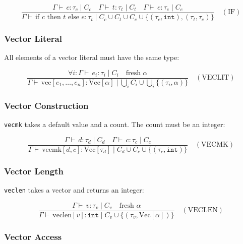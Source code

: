 \documentclass[12pt]{article}
\newcommand{\judge}[1]{\vdash \, #1}
\newcommand{\env}{\Gamma}
\newcommand{\type}{\tau}
\begin{document}
\begin{equation*}
\frac{
  \env \judge{c : \type_c \mid C_c}
  \quad
  \env \judge{t : \type_t \mid C_t}
  \quad
  \env \judge{e : \type_e \mid C_e}
}{
  \env \judge{\text{if } c \text{ then } t \text{ else } e : \type_t \mid C_c \cup C_t \cup C_e \cup \{(\type_c, \mathtt{int}), (\type_t, \type_e)\}}
}
\quad (\text{IF})
\end{equation*}

\subsubsection{Vector Literal}

All elements of a vector literal must have the same type:

\begin{equation*}
\frac{
  \forall i : \env \judge{e_i : \type_i \mid C_i}
  \quad
  \text{fresh } \alpha
}{
  \env \judge{\text{vec}[e_1, \ldots, e_n] : \text{Vec}[\alpha] \mid \bigcup_i C_i \cup \bigcup_i \{(\type_i, \alpha)\}}
}
\quad (\text{VECLIT})
\end{equation*}

\subsubsection{Vector Construction}

\texttt{vecmk} takes a default value and a count. The count must be an integer:

\begin{equation*}
\frac{
  \env \judge{d : \type_d \mid C_d}
  \quad
  \env \judge{c : \type_c \mid C_c}
}{
  \env \judge{\text{vecmk}[d, c] : \text{Vec}[\type_d] \mid C_d \cup C_c \cup \{(\type_c, \mathtt{int})\}}
}
\quad (\text{VECMK})
\end{equation*}

\subsubsection{Vector Length}

\texttt{veclen} takes a vector and returns an integer:

\begin{equation*}
\frac{
  \env \judge{v : \type_v \mid C_v}
  \quad
  \text{fresh } \alpha
}{
  \env \judge{\text{veclen}[v] : \mathtt{int} \mid C_v \cup \{(\type_v, \text{Vec}[\alpha])\}}
}
\quad (\text{VECLEN})
\end{equation*}

\subsubsection{Vector Access}
\end{document}
